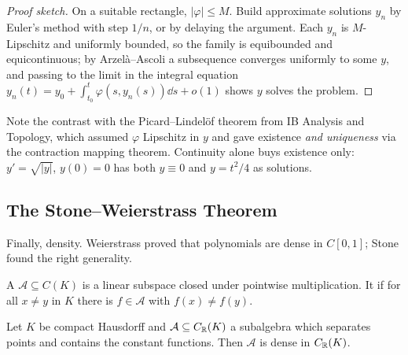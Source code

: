 \documentclass[a4paper]{scrartcl}
\begin{document}
\begin{proof}[Proof sketch]
	On a suitable rectangle, $|\varphi| \leq M$. Build approximate solutions $y_n$ by Euler's method with step $1/n$, or by delaying the argument. Each $y_n$ is $M$-Lipschitz and uniformly bounded, so the family is equibounded and equicontinuous; by Arzelà--Ascoli a subsequence converges uniformly to some $y$, and passing to the limit in the integral equation $y_n(t) = y_0 + \int_{t_0}^t \varphi(s,y_n(s))\dd s + o(1)$ shows $y$ solves the problem.
\end{proof}

Note the contrast with the Picard--Lindelöf theorem from IB Analysis and Topology, which assumed $\varphi$ Lipschitz in $y$ and gave existence \emph{and uniqueness} via the contraction mapping theorem. Continuity alone buys existence only: $y' = \sqrt{|y|}$, $y(0)=0$ has both $y \equiv 0$ and $y = t^2/4$ as solutions.

\subsection{The Stone--Weierstrass Theorem}

Finally, density. Weierstrass proved that polynomials are dense in $C[0,1]$; Stone found the right generality.

\begin{definition}[Subalgebra]
	A  $\mathcal{A} \subseteq C(K)$ is a linear subspace closed under pointwise multiplication. It  if for all $x \neq y$ in $K$ there is $f \in \mathcal{A}$ with $f(x)\neq f(y)$.
\end{definition}

\begin{theorem}
	Let $K$ be compact Hausdorff and $\mathcal{A} \subseteq C_{\mathbb{R}}(K)$ a subalgebra which separates points and contains the constant functions. Then $\mathcal{A}$ is dense in $C_{\mathbb{R}}(K)$.
\end{theorem}
\end{document}
